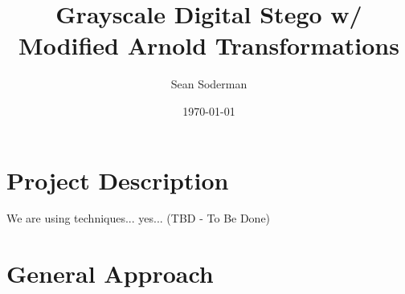 \documentclass{article}
\begin{document}
\title{Grayscale Digital Stego w/ Modified Arnold Transformations}
\author{Sean Soderman}
\date{\today}
\maketitle

\section{Project Description}
We are using techniques... yes... (TBD - To Be Done)


\section{General Approach}
\end{document}
